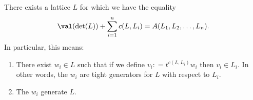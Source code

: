 \begin{theorem} \label{main} There exists a lattice $L$ for which we have the equality
\[
\val(\det(L)) + \sum_{i=1}^n c(L,L_i) = A(L_1, L_2, \dots, L_n).
\]
In particular, this means: 
\begin{enumerate}
\item There exist $w_i \in L$ such that if we define $v_i : = t^{c(L,L_i)} w_i$ then $v_i \in L_i$. In other words, the $w_i$ are tight generators for $L$ with respect to $L_i$.
\item The $w_i$ generate $L$.
\end{enumerate}
\end{theorem}
